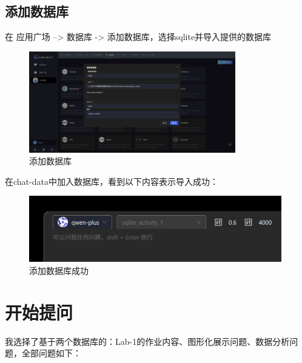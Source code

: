 \documentclass{article}
\begin{document}
	\subsection{添加数据库}
	
	在 应用广场 –> 数据库 -> 添加数据库，选择sqlite并导入提供的数据库
	
	\begin{figure}[H]
		\centering
		\includegraphics[width=9cm]{./images/21.添加数据库.png}
		\caption{添加数据库}
	\end{figure}
	
	在chat-data中加入数据库，看到以下内容表示导入成功：
	
	\begin{figure}[H]
		\centering
		\includegraphics[width=11cm]{./images/22.添加数据库成功.png}
		\caption{添加数据库成功}
	\end{figure}
	
	\section{开始提问}
	
	我选择了基于两个数据库的：Lab-1的作业内容、图形化展示问题、数据分析问题，全部问题如下：
	
\end{document}
